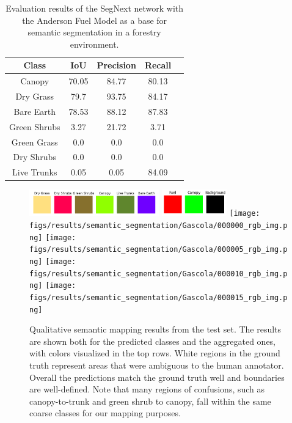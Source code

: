 \begin{table}[ht!]
    \centering
\begin{tabular}{ccccc}
\toprule
\textbf{Class} & \textbf{IoU} & \textbf{Precision} & \textbf{Recall} \\ \midrule
Canopy & 70.05 & 84.77 & 80.13 \\
Dry Grass & 79.7 & 93.75 & 84.17 \\
Bare Earth & 78.53 & 88.12 & 87.83 \\
Green Shrubs & 3.27 & 21.72 & 3.71 \\
Green Grass & 0.0 & 0.0 & 0.0 \\
Dry Shrubs & 0.0 & 0.0 & 0.0 \\
Live Trunks & 0.05 & 0.05 & 84.09 \\
\bottomrule
\end{tabular}
\caption{Evaluation results of the SegNext network with the Anderson Fuel Model as a base for semantic segmentation in a forestry environment.}
\label{tab:semantic_eval}
\end{table}


\begin{figure}[h!]
   \centering
   \includegraphics[width=0.5\textwidth]{figs/results/semantic_segmentation/Gascola/safeforest_all_classes_flat.png}
   \includegraphics[width=0.25\textwidth]{figs/results/semantic_segmentation/Gascola/safeforest_classmap_compressed_flat.png}
   \texttt{[image: figs/results/semantic\_segmentation/Gascola/000000\_rgb\_img.png]}
   \vspace{0pt}
   \texttt{[image: figs/results/semantic\_segmentation/Gascola/000005\_rgb\_img.png]}
   \vspace{0pt}
   \texttt{[image: figs/results/semantic\_segmentation/Gascola/000010\_rgb\_img.png]}
   \vspace{0pt}
   \texttt{[image: figs/results/semantic\_segmentation/Gascola/000015\_rgb\_img.png]}
   \vspace{0pt}
   \caption{
   Qualitative semantic mapping results from the test set. The results are shown both for the predicted classes and the aggregated ones, with colors visualized in the top rows.
   White regions in the ground truth represent areas that were ambiguous to the human annotator. Overall the predictions match the ground truth well and boundaries are well-defined. Note that many regions of confusions, such as canopy-to-trunk and green shrub to canopy, fall within the same coarse classes for our mapping purposes.
   }
   \label{fig:results_semantic_seg_qualitative}                %
\end{figure}

